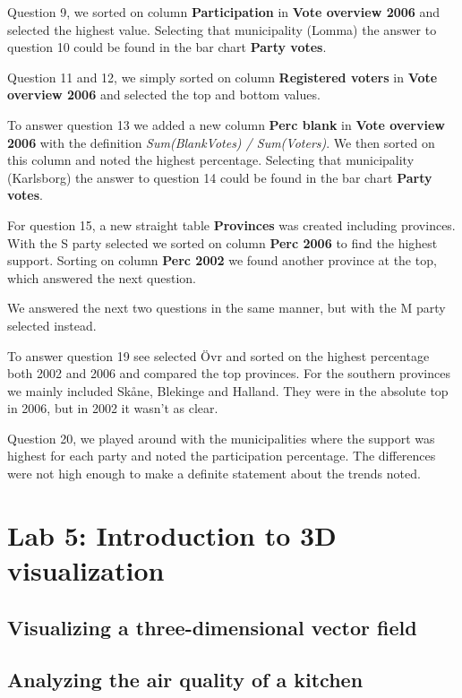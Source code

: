 \documentclass[a4paper]{article}
\begin{document}
Question 9, we sorted on column \textbf{Participation} in \textbf{Vote overview
2006} and selected the highest value. Selecting that municipality (Lomma) the
answer to question 10 could be found in the bar chart \textbf{Party votes}.

Question 11 and 12, we simply sorted on column \textbf{Registered voters} in
\textbf{Vote overview 2006} and selected the top and bottom values.

To answer question 13 we added a new column \textbf{Perc blank} in \textbf{Vote
overview 2006} with the definition \textit{Sum(BlankVotes) / Sum(Voters)}. We
then sorted on this column and noted the highest percentage. Selecting that
municipality (Karlsborg) the answer to question 14 could be found in the bar
chart \textbf{Party votes}.

For question 15, a new straight table \textbf{Provinces} was created including
provinces. With the S party selected we sorted on column \textbf{Perc 2006} to
find the highest support. Sorting on column \textbf{Perc 2002} we found another
province at the top, which answered the next question.

We answered the next two questions in the same manner, but with the M party
selected instead.

To answer question 19 see selected \"Ovr and sorted on the highest percentage
both 2002 and 2006 and compared the top provinces. For the southern provinces we
mainly included Sk\aa ne, Blekinge and Halland. They were in the absolute top in
2006, but in 2002 it wasn't as clear.

Question 20, we played around with the municipalities where the support was
highest for each party and noted the participation percentage. The differences
were not high enough to make a definite statement about the trends noted.

\section{Lab 5: Introduction to 3D visualization}

\subsection{Visualizing a three-dimensional vector field}

\subsection{Analyzing the air quality of a kitchen}
\end{document}
